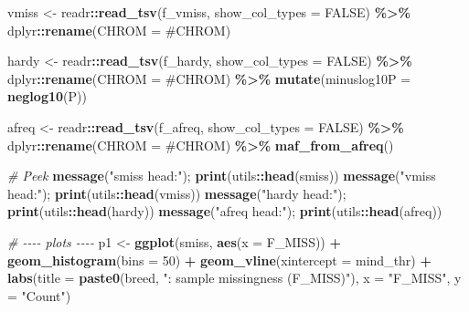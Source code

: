\documentclass[
]{article}
\newenvironment{Shaded}{\begin{snugshade}}{\end{snugshade}}
\newcommand{\AttributeTok}[1]{\textcolor[rgb]{0.13,0.29,0.53}{#1}}
\newcommand{\CommentTok}[1]{\textcolor[rgb]{0.56,0.35,0.01}{\textit{#1}}}
\newcommand{\ConstantTok}[1]{\textcolor[rgb]{0.56,0.35,0.01}{#1}}
\newcommand{\DecValTok}[1]{\textcolor[rgb]{0.00,0.00,0.81}{#1}}
\newcommand{\FunctionTok}[1]{\textcolor[rgb]{0.13,0.29,0.53}{\textbf{#1}}}
\newcommand{\NormalTok}[1]{#1}
\newcommand{\OtherTok}[1]{\textcolor[rgb]{0.56,0.35,0.01}{#1}}
\newcommand{\SpecialCharTok}[1]{\textcolor[rgb]{0.81,0.36,0.00}{\textbf{#1}}}
\newcommand{\StringTok}[1]{\textcolor[rgb]{0.31,0.60,0.02}{#1}}
\begin{document}
\begin{Shaded}
\begin{Highlighting}[]
\NormalTok{  vmiss }\OtherTok{\textless{}{-}}\NormalTok{ readr}\SpecialCharTok{::}\FunctionTok{read\_tsv}\NormalTok{(f\_vmiss, }\AttributeTok{show\_col\_types =} \ConstantTok{FALSE}\NormalTok{) }\SpecialCharTok{\%\textgreater{}\%}
\NormalTok{    dplyr}\SpecialCharTok{::}\FunctionTok{rename}\NormalTok{(}\AttributeTok{CHROM =} \StringTok{\textasciigrave{}}\AttributeTok{\#CHROM}\StringTok{\textasciigrave{}}\NormalTok{)}
  
\NormalTok{  hardy }\OtherTok{\textless{}{-}}\NormalTok{ readr}\SpecialCharTok{::}\FunctionTok{read\_tsv}\NormalTok{(f\_hardy, }\AttributeTok{show\_col\_types =} \ConstantTok{FALSE}\NormalTok{) }\SpecialCharTok{\%\textgreater{}\%}
\NormalTok{    dplyr}\SpecialCharTok{::}\FunctionTok{rename}\NormalTok{(}\AttributeTok{CHROM =} \StringTok{\textasciigrave{}}\AttributeTok{\#CHROM}\StringTok{\textasciigrave{}}\NormalTok{) }\SpecialCharTok{\%\textgreater{}\%}
    \FunctionTok{mutate}\NormalTok{(}\AttributeTok{minuslog10P =} \FunctionTok{neglog10}\NormalTok{(P))}
  
\NormalTok{  afreq }\OtherTok{\textless{}{-}}\NormalTok{ readr}\SpecialCharTok{::}\FunctionTok{read\_tsv}\NormalTok{(f\_afreq, }\AttributeTok{show\_col\_types =} \ConstantTok{FALSE}\NormalTok{) }\SpecialCharTok{\%\textgreater{}\%}
\NormalTok{    dplyr}\SpecialCharTok{::}\FunctionTok{rename}\NormalTok{(}\AttributeTok{CHROM =} \StringTok{\textasciigrave{}}\AttributeTok{\#CHROM}\StringTok{\textasciigrave{}}\NormalTok{) }\SpecialCharTok{\%\textgreater{}\%}
    \FunctionTok{maf\_from\_afreq}\NormalTok{()}
  
  \CommentTok{\# Peek}
  \FunctionTok{message}\NormalTok{(}\StringTok{"smiss head:"}\NormalTok{); }\FunctionTok{print}\NormalTok{(utils}\SpecialCharTok{::}\FunctionTok{head}\NormalTok{(smiss))}
  \FunctionTok{message}\NormalTok{(}\StringTok{"vmiss head:"}\NormalTok{); }\FunctionTok{print}\NormalTok{(utils}\SpecialCharTok{::}\FunctionTok{head}\NormalTok{(vmiss))}
  \FunctionTok{message}\NormalTok{(}\StringTok{"hardy head:"}\NormalTok{); }\FunctionTok{print}\NormalTok{(utils}\SpecialCharTok{::}\FunctionTok{head}\NormalTok{(hardy))}
  \FunctionTok{message}\NormalTok{(}\StringTok{"afreq head:"}\NormalTok{); }\FunctionTok{print}\NormalTok{(utils}\SpecialCharTok{::}\FunctionTok{head}\NormalTok{(afreq))}
  
  \CommentTok{\# {-}{-}{-}{-} plots {-}{-}{-}{-}}
\NormalTok{  p1 }\OtherTok{\textless{}{-}} \FunctionTok{ggplot}\NormalTok{(smiss, }\FunctionTok{aes}\NormalTok{(}\AttributeTok{x =}\NormalTok{ F\_MISS)) }\SpecialCharTok{+}
    \FunctionTok{geom\_histogram}\NormalTok{(}\AttributeTok{bins =} \DecValTok{50}\NormalTok{) }\SpecialCharTok{+}
    \FunctionTok{geom\_vline}\NormalTok{(}\AttributeTok{xintercept =}\NormalTok{ mind\_thr) }\SpecialCharTok{+}
    \FunctionTok{labs}\NormalTok{(}\AttributeTok{title =} \FunctionTok{paste0}\NormalTok{(breed, }\StringTok{": sample missingness (F\_MISS)"}\NormalTok{),}
         \AttributeTok{x =} \StringTok{"F\_MISS"}\NormalTok{, }\AttributeTok{y =} \StringTok{"Count"}\NormalTok{)}
  

\end{Highlighting}
\end{Shaded}
\end{document}
